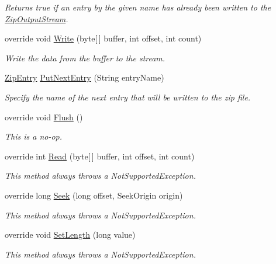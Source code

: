 \begin{DoxyCompactItemize}
\begin{DoxyCompactList}\small\item\em Returns true if an entry by the given name has already been written to the \mbox{\hyperlink{class_super_tiled2_unity_1_1_ionic_1_1_zip_1_1_zip_output_stream}{Zip\+Output\+Stream}}. \end{DoxyCompactList}\item 
override void \mbox{\hyperlink{class_super_tiled2_unity_1_1_ionic_1_1_zip_1_1_zip_output_stream_a8cd95df92691b8f266216f1d6984dfec}{Write}} (byte\mbox{[}$\,$\mbox{]} buffer, int offset, int count)
\begin{DoxyCompactList}\small\item\em Write the data from the buffer to the stream. \end{DoxyCompactList}\item 
\mbox{\hyperlink{class_super_tiled2_unity_1_1_ionic_1_1_zip_1_1_zip_entry}{Zip\+Entry}} \mbox{\hyperlink{class_super_tiled2_unity_1_1_ionic_1_1_zip_1_1_zip_output_stream_a6328a636a423976167278aca779a3eca}{Put\+Next\+Entry}} (String entry\+Name)
\begin{DoxyCompactList}\small\item\em Specify the name of the next entry that will be written to the zip file. \end{DoxyCompactList}\item 
override void \mbox{\hyperlink{class_super_tiled2_unity_1_1_ionic_1_1_zip_1_1_zip_output_stream_aef2a751108f7c3ab281f544d33ab9355}{Flush}} ()
\begin{DoxyCompactList}\small\item\em This is a no-\/op. \end{DoxyCompactList}\item 
override int \mbox{\hyperlink{class_super_tiled2_unity_1_1_ionic_1_1_zip_1_1_zip_output_stream_af8c42b2228926fef65cb3f5efffebb6e}{Read}} (byte\mbox{[}$\,$\mbox{]} buffer, int offset, int count)
\begin{DoxyCompactList}\small\item\em This method always throws a Not\+Supported\+Exception. \end{DoxyCompactList}\item 
override long \mbox{\hyperlink{class_super_tiled2_unity_1_1_ionic_1_1_zip_1_1_zip_output_stream_ac475f96618eb6e4e53c3ec417e73e017}{Seek}} (long offset, Seek\+Origin origin)
\begin{DoxyCompactList}\small\item\em This method always throws a Not\+Supported\+Exception. \end{DoxyCompactList}\item 
override void \mbox{\hyperlink{class_super_tiled2_unity_1_1_ionic_1_1_zip_1_1_zip_output_stream_a9486ebdf72376451582daa854e941637}{Set\+Length}} (long value)
\begin{DoxyCompactList}\small\item\em This method always throws a Not\+Supported\+Exception. \end{DoxyCompactList}\end{DoxyCompactItemize}
